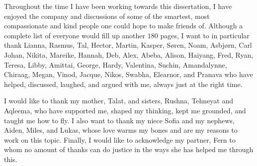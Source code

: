 \begin{acknowledgements}
Throughout the time I have been working towards this dissertation, I have enjoyed the company and discussions of some of the smartest, most compassionate and kind people one could hope to make friends of.
Although a complete list of everyone would fill up another $180$ pages, I want to in particular thank Lianna, Rasmus, Tal, Hector, Martin, Kasper, Søren, Noam, Asbjørn, Carl Johan, Nikita, Mareike, Hannah, Deb, Alex, Abeba, Alison, Haiyang, Fred, Ryan, Teresa, Libby, Amittai, George, Hardy, Valentina, Suchin, Amandalynne, Chiraag, Megan, Vinod, Jacque, Nikos, Swabha, Elearnor, and Pranava who have helped, discussed, laughed, and argued with me, always just at the right time.

I would like to thank my mother, Talat, and sisters, Rushna, Tehneyat and Aqleema, who have supported me, shaped my thinking, kept me grounded, and taught me how to fly. I also want to thank my niece Sofia and my nephews, Aiden, Miles, and Lukas, whose love warms my bones and are my reasons to work on this topic.
Finally, I would like to acknowledge my partner, Fern to whom no amount of thanks can do justice in the ways she has helped me through this.
\end{acknowledgements}
